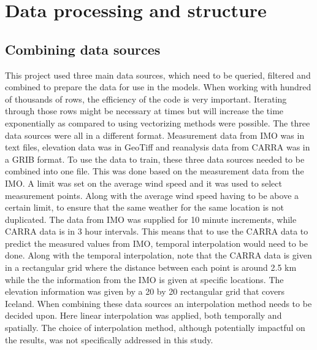 \chapter{Data processing and structure}
\label{Chapter3} 
\section{Combining data sources}

This project used three main data sources, which need to be queried, filtered and combined to prepare the data for use in the models. When working with hundred of thousands of rows, the efficiency of the code is very important. Iterating through those rows might be necessary at times but will increase the time exponentially as compared to using vectorizing methods were possible. The three data sources were all in a different format. Measurement data from IMO was in text files, elevation data was in GeoTiff and reanalysis data from CARRA was in a GRIB format. To use the data to train, these three data sources needed to be combined into one file. This was done based on the measurement data from the IMO. A limit was set on the average wind speed and it was used to select measurement points. Along with the average wind speed having to be above a certain limit, to ensure that the same weather for the same location is not duplicated. The data from IMO was supplied for 10 minute increments, while CARRA data is in 3 hour intervals. This means that to use the CARRA data to predict the measured values from IMO, temporal interpolation would need to be done. Along with the temporal interpolation, note that the CARRA data is given in a rectangular grid where the distance between each point is around 2.5 km while the the information from the IMO is given at specific locations. The elevation information was given by a 20 by 20 rectangular grid that covers Iceland. When combining these data sources an interpolation method needs to be decided upon. Here linear interpolation was applied, both temporally and spatially. The choice of interpolation method, although potentially impactful on the results, was not specifically addressed in this study.

